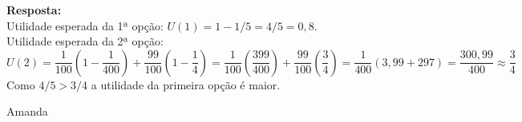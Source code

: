 \begin{enumerate}
\textbf{Resposta:}\\

Utilidade esperada da 1ª opção: {$ U(1) = 1 - 1/5 = 4/5 = 0,8.$}\\

Utilidade esperada da 2ª opção: {$ U(2) = \dfrac{1}{100} \left( 1 - \dfrac{1}{400} \right) + \dfrac{99}{100} \left( 1 - \dfrac{1}{4} \right) = \dfrac{1}{100} \left(\dfrac{399}{400} \right) + \dfrac{99}{100} \left(\dfrac{3}{4} \right) = \dfrac{1}{400} (3,99 + 297) = \dfrac{300,99}{400} \approx \dfrac{3}{4}$}\\

Como {$4/5 > 3/4$} a utilidade da primeira opção é maior.


\end{enumerate}

Amanda
